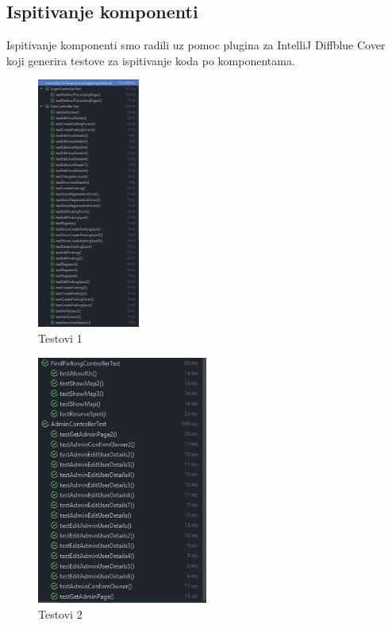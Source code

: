 			\subsection{Ispitivanje komponenti}
			Ispitivanje komponenti smo radili uz pomoc plugina za IntelliJ Diffblue Cover koji generira testove za ispitivanje koda po komponentama.
			\begin{figure}[H]
				
				\includegraphics[width=0.3\textwidth]{slike/testovi1.jpeg} %
				\centering
				\caption{Testovi 1}
				\label{fig:testovi1}
			\end{figure}
		\begin{figure}[H]
			
			\includegraphics[width=0.5\textwidth]{slike/testovi2.jpeg} %
			\centering
			\caption{Testovi 2}
			\label{fig:testovi2}
		\end{figure}
			
